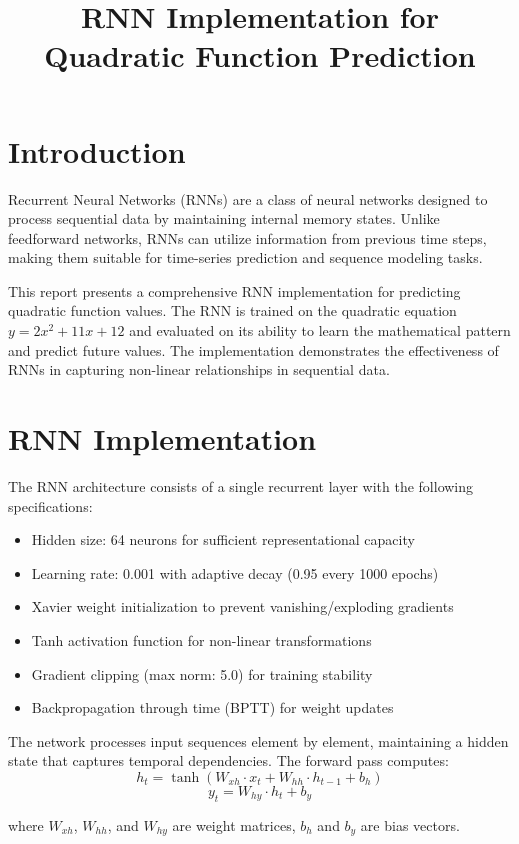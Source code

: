 \documentclass[11pt,a4paper]{article}
\title{RNN Implementation for Quadratic Function Prediction}
\author{}
\date{}
\begin{document}
\maketitle

\section{Introduction}

Recurrent Neural Networks (RNNs) are a class of neural networks designed to process sequential data by maintaining internal memory states. Unlike feedforward networks, RNNs can utilize information from previous time steps, making them suitable for time-series prediction and sequence modeling tasks.

This report presents a comprehensive RNN implementation for predicting quadratic function values. The RNN is trained on the quadratic equation $y = 2x^2 + 11x + 12$ and evaluated on its ability to learn the mathematical pattern and predict future values. The implementation demonstrates the effectiveness of RNNs in capturing non-linear relationships in sequential data.

\section{RNN Implementation}

The RNN architecture consists of a single recurrent layer with the following specifications:
\begin{itemize}
\item Hidden size: 64 neurons for sufficient representational capacity
\item Learning rate: 0.001 with adaptive decay (0.95 every 1000 epochs)
\item Xavier weight initialization to prevent vanishing/exploding gradients
\item Tanh activation function for non-linear transformations
\item Gradient clipping (max norm: 5.0) for training stability
\item Backpropagation through time (BPTT) for weight updates
\end{itemize}

The network processes input sequences element by element, maintaining a hidden state that captures temporal dependencies. The forward pass computes:
$$h_t = \tanh(W_{xh} \cdot x_t + W_{hh} \cdot h_{t-1} + b_h)$$
$$y_t = W_{hy} \cdot h_t + b_y$$

where $W_{xh}$, $W_{hh}$, and $W_{hy}$ are weight matrices, $b_h$ and $b_y$ are bias vectors.
\end{document}
